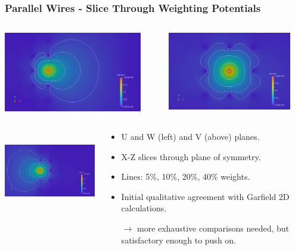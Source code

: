 \documentclass[xcolor=dvipsnames]{beamer}
\begin{document}
\begin{frame}
  \frametitle{Parallel Wires - Slice Through Weighting Potentials}
  \begin{columns}
    \begin{column}{0.5\textwidth}
      \begin{center}
        \includegraphics[height=3.5cm]{twodee-fine-u7.png}        
      \end{center}
    \end{column}
    \begin{column}{0.5\textwidth}
      \begin{center}
        \includegraphics[height=3.4cm]{twodee-fine-v7.png}        
      \end{center}
    \end{column}
  \end{columns}
  \vspace{-1cm}
  \begin{columns}
    \begin{column}{0.5\textwidth}
      \begin{center}
        \includegraphics[height=3.5cm]{twodee-fine-w7.png}        
      \end{center}
    \end{column}
    \begin{column}{0.5\textwidth}
      \begin{itemize}\scriptsize
      \item U and W (left) and V (above) planes.
      \item X-Z slices through plane of symmetry.
      \item Lines: 5\%, 10\%, 20\%, 40\% weights.
      \item Initial qualitative agreement with Garfield 2D calculations.
      \item[$\rightarrow$] more exhaustive comparisons needed,
        but satisfactory enough to push on.
      \end{itemize}
    \end{column}
  \end{columns}


\end{frame}
\end{document}
